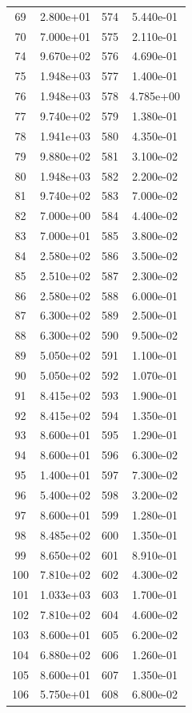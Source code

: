 \documentclass[12pt]{article}
\begin{document}
\begin{longtable}{@{}cccc@{}}
69 & 2.800e+01 & 574 & 5.440e-01 \\
70 & 7.000e+01 & 575 & 2.110e-01 \\
74 & 9.670e+02 & 576 & 4.690e-01 \\
75 & 1.948e+03 & 577 & 1.400e-01 \\
76 & 1.948e+03 & 578 & 4.785e+00 \\
77 & 9.740e+02 & 579 & 1.380e-01 \\
78 & 1.941e+03 & 580 & 4.350e-01 \\
79 & 9.880e+02 & 581 & 3.100e-02 \\
80 & 1.948e+03 & 582 & 2.200e-02 \\
81 & 9.740e+02 & 583 & 7.000e-02 \\
82 & 7.000e+00 & 584 & 4.400e-02 \\
83 & 7.000e+01 & 585 & 3.800e-02 \\
84 & 2.580e+02 & 586 & 3.500e-02 \\
85 & 2.510e+02 & 587 & 2.300e-02 \\
86 & 2.580e+02 & 588 & 6.000e-01 \\
87 & 6.300e+02 & 589 & 2.500e-01 \\
88 & 6.300e+02 & 590 & 9.500e-02 \\
89 & 5.050e+02 & 591 & 1.100e-01 \\
90 & 5.050e+02 & 592 & 1.070e-01 \\
91 & 8.415e+02 & 593 & 1.900e-01 \\
92 & 8.415e+02 & 594 & 1.350e-01 \\
93 & 8.600e+01 & 595 & 1.290e-01 \\
94 & 8.600e+01 & 596 & 6.300e-02 \\
95 & 1.400e+01 & 597 & 7.300e-02 \\
96 & 5.400e+02 & 598 & 3.200e-02 \\
97 & 8.600e+01 & 599 & 1.280e-01 \\
98 & 8.485e+02 & 600 & 1.350e-01 \\
99 & 8.650e+02 & 601 & 8.910e-01 \\
100 & 7.810e+02 & 602 & 4.300e-02 \\
101 & 1.033e+03 & 603 & 1.700e-01 \\
102 & 7.810e+02 & 604 & 4.600e-02 \\
103 & 8.600e+01 & 605 & 6.200e-02 \\
104 & 6.880e+02 & 606 & 1.260e-01 \\
105 & 8.600e+01 & 607 & 1.350e-01 \\
106 & 5.750e+01 & 608 & 6.800e-02 \\

\end{longtable}
\end{document}
